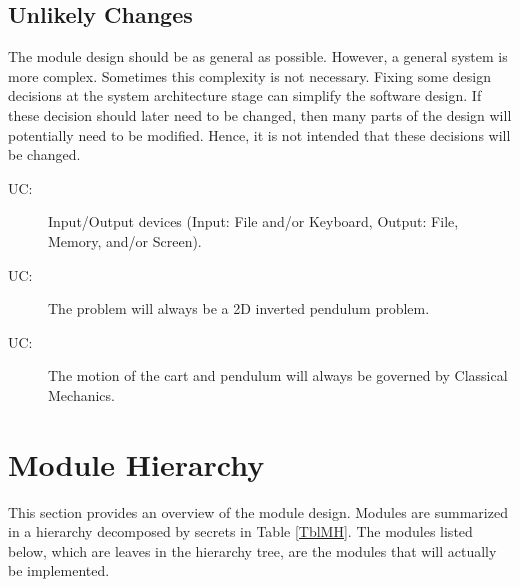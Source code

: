 \documentclass[12pt, titlepage]{article}
\newcounter{ucnum}
\newcommand{\uctheucnum}{UC\theucnum}
\begin{document}
\subsection{Unlikely Changes} \label{SecUchange}

The module design should be as general as possible. However, a general system is
more complex. Sometimes this complexity is not necessary. Fixing some design
decisions at the system architecture stage can simplify the software design. If
these decision should later need to be changed, then many parts of the design
will potentially need to be modified. Hence, it is not intended that these
decisions will be changed.

\begin{description}
\item[ \uctheucnum \label{ucIO}:] Input/Output devices
  (Input: File and/or Keyboard, Output: File, Memory, and/or Screen).
\item[ \uctheucnum \label{uc2D}:] The problem will 
      always be a 2D inverted pendulum problem.
\item[ \uctheucnum \label{ucClassicalMechanics}:] The motion of 
      the cart and pendulum will always be governed by Classical Mechanics.
\end{description}

\section{Module Hierarchy} \label{SecMH}

This section provides an overview of the module design. Modules are summarized
in a hierarchy decomposed by secrets in Table \ref{TblMH}. The modules listed
below, which are leaves in the hierarchy tree, are the modules that will
actually be implemented.
\end{document}
